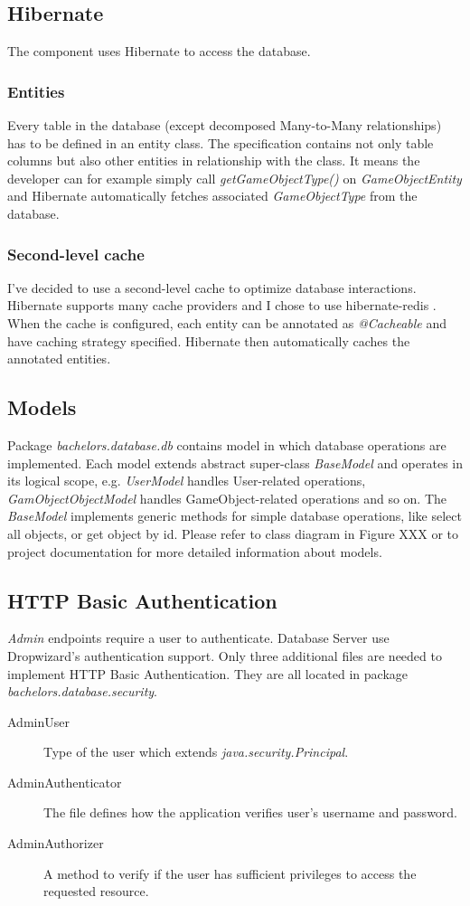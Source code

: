 \subsection{Hibernate}
The component uses Hibernate to access the database.

\subsubsection{Entities}
Every table in the database (except decomposed Many-to-Many relationships) has to be defined in an entity class. The specification contains not only table columns but also other entities in relationship with the class. It means the developer can for example simply call \textit{getGameObjectType()} on \textit{GameObjectEntity} and Hibernate automatically fetches associated \textit{GameObjectType} from the database.

\subsubsection{Second-level cache}
I've decided to use a second-level cache to optimize database interactions. Hibernate supports many cache providers and I chose to use hibernate-redis \cite{hibernateredis}. When the cache is configured, each entity can be annotated as \textit{@Cacheable} and have caching strategy specified. Hibernate then automatically caches the annotated entities.

\subsection{Models}
Package \textit{bachelors.database.db} contains model in which database operations are implemented. Each model extends abstract super-class \textit{BaseModel} and operates in its logical scope, e.g. \textit{UserModel} handles User-related operations, \textit{GamObjectObjectModel} handles GameObject-related operations and so on. The \textit{BaseModel} implements generic methods for simple database operations, like select all objects, or get object by id. Please refer to class diagram in Figure XXX or to project documentation for more detailed information about models.

\subsection{HTTP Basic Authentication} 
\textit{Admin} endpoints require a user to authenticate. Database Server use Dropwizard's authentication support. Only three additional files are needed to implement HTTP Basic Authentication. They are all located in package \textit{bachelors.database.security}. 
\begin{description}
	\item[AdminUser] Type of the user which extends \textit{java.security.Principal}.
	\item[AdminAuthenticator] The file defines how the application verifies user's username and password.
	\item[AdminAuthorizer] A method to verify if the user has sufficient privileges to access the requested resource.
\end{description}


